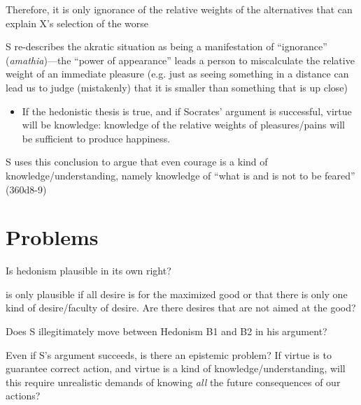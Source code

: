 \documentclass[oneside]{article}
\begin{document}
 \noindent [C] Therefore, it is only ignorance of the relative weights of the alternatives that can explain X's selection of the worse
\vspace*{2mm}
 
 \noindent S re-describes the akratic situation as being a manifestation of ``ignorance'' (\emph{amathia})---the ``power of appearance'' leads a person to miscalculate the relative weight of an immediate pleasure (e.g. just as seeing something in a distance can lead us to judge (mistakenly) that it is smaller than something that is up close)
 \begin{itemize}
 \item If the hedonistic thesis is true, and if Socrates' argument is successful, virtue will be knowledge: knowledge of the relative weights of pleasures/pains will be sufficient to produce happiness.
 \end{itemize}
 \vspace*{2mm}
 
 \noindent S uses this conclusion to argue that even courage is a kind of knowledge/understanding, namely knowledge of ``what is and is not to be feared'' (360d8-9)
 
\section*{Problems}
 
 \noindent Is hedonism plausible in its own right?
 \vspace*{2mm}
 
 \noindent [P6] is only plausible if all desire is for the maximized good or that there is only one kind of desire/faculty of desire. Are there desires that are not aimed at the good?
 \vspace*{2mm}
  
 \noindent Does S illegitimately move between Hedonism B1 and B2 in his argument?
 \vspace*{2mm}
 
 \noindent Even if S's argument succeeds, is there an epistemic problem? If virtue is to guarantee correct action, and virtue is a kind of knowledge/understanding, will this require unrealistic demands of knowing \emph{all} the future consequences of our actions?
\end{document}
